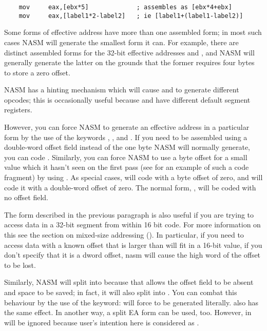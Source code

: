 \begin{lstlisting}
	mov     eax,[ebx*5]             ; assembles as [ebx*4+ebx]
	mov     eax,[label1*2-label2]   ; ie [label1+(label1-label2)]
\end{lstlisting}

Some forms of effective address have more than one assembled form;
in most such cases NASM will generate the smallest form it can. For
example, there are distinct assembled forms for the 32-bit effective
addresses \code{[eax*2+0]} and , and NASM will
generally generate the latter on the grounds that the former requires
four bytes to store a zero offset.

NASM has a hinting mechanism which will cause  and
 to generate different opcodes; this is occasionally
useful because  and  have different
default segment registers.

However, you can force NASM to generate an effective address in a
particular form by the use of the keywords , ,
 and . If you need \code{[eax+3]} to be
assembled using a double-word offset field instead of the one byte NASM
will normally generate, you can code . Similarly, you
can force NASM to use a byte offset for a small value which it hasn't seen
on the first pass (see  for an example of such a code
fragment) by using . As special cases, 
will code \code{[eax+0]} with a byte offset of zero, and 
will code it with a double-word offset of zero. The normal form, \code{[eax]},
will be coded with no offset field.

The form described in the previous paragraph is also useful if you
are trying to access data in a 32-bit segment from within 16 bit code.
For more information on this see the section on mixed-size addressing
(). In particular, if you need to access data with
a known offset that is larger than will fit in a 16-bit value, if you don't
specify that it is a dword offset, nasm will cause the high word of
the offset to be lost.

Similarly, NASM will split \code{[eax*2]} into  because
that allows the offset field to be absent and space to be saved; in fact,
it will also split  into .
You can combat this behaviour by the use of the  keyword:
 will force \code{[eax*2+0]} to be generated literally.
 also has the same effect. In another way, a split EA
form \code{[0, eax*2]} can be used, too.  However,  in
 will be ignored because user's intention here
is considered as .

